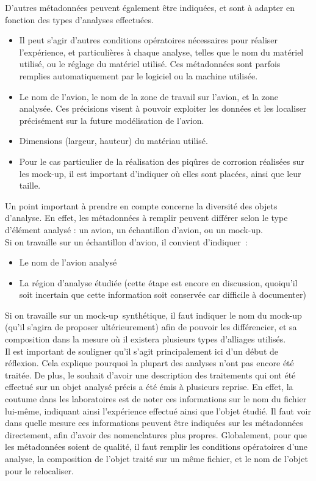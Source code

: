 D’autres métadonnées peuvent également être indiquées, et sont à adapter en fonction des types d’analyses effectuées.\\
\begin{itemize}
    \item Il peut s’agir d’autres conditions opératoires nécessaires pour réaliser l’expérience, et particulières à chaque analyse, telles que le nom du matériel utilisé, ou le réglage du matériel utilisé. Ces métadonnées sont parfois remplies automatiquement par le logiciel ou la machine utilisée.
    \item Le nom de l'avion, le nom de la zone de travail sur l'avion, et la zone analysée. Ces précisions visent à pouvoir exploiter les données et les localiser précisément sur la future modélisation de l’avion.
    \item Dimensions (largeur, hauteur) du matériau utilisé.
    \item Pour le cas particulier de la réalisation des piqûres de corrosion réalisées sur les mock-up, il est important d’indiquer où elles sont placées, ainsi que leur taille.
\end{itemize}

Un point important à prendre en compte concerne la diversité des objets d’analyse. En effet, les métadonnées à remplir peuvent différer selon le type d’élément analysé : un avion, un échantillon d’avion, ou un mock-up.\\

Si on travaille sur un échantillon d’avion, il convient d’indiquer :\\

\begin{itemize}
    \item Le nom de l’avion analysé
    \item La région d’analyse étudiée (cette étape est encore en discussion, quoiqu’il soit incertain que cette information soit conservée car difficile à documenter) 
\end{itemize}

Si on travaille sur un mock-up synthétique, il faut indiquer le nom du mock-up (qu’il s’agira de proposer ultérieurement) afin de pouvoir les différencier, et sa composition dans la mesure où il existera plusieurs types d'alliages utilisés.\\

Il est important de souligner qu’il s’agit principalement ici d’un début de réflexion. Cela explique pourquoi la plupart des analyses n’ont pas encore été traitée. De plus, le souhait d’avoir une description des traitements qui ont été effectué sur un objet analysé précis a été émis à plusieurs reprise. En effet, la coutume dans les laboratoires est de noter ces informations sur le nom du fichier lui-même, indiquant ainsi l’expérience effectué ainsi que l’objet étudié. Il faut voir dans quelle mesure ces informations peuvent être indiquées sur les métadonnées directement, afin d’avoir des nomenclatures plus propres. Globalement, pour que les métadonnées soient de qualité, il faut remplir les conditions opératoires d’une analyse, la composition de l’objet traité sur un même fichier, et le nom de l’objet pour le relocaliser.\\

